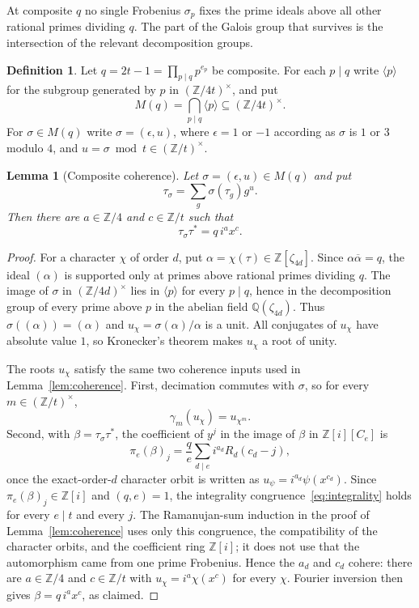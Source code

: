 \documentclass[11pt]{article}
\theoremstyle{plain}
\newtheorem{lemma}[theorem]{Lemma}
\theoremstyle{definition}
\newtheorem{definition}[theorem]{Definition}
\theoremstyle{remark}
\newcommand{\Z}{\mathbb Z}
\newcommand{\Q}{\mathbb Q}
\begin{document}
At composite $q$ no single Frobenius $\sigma_p$ fixes the prime ideals above all
other rational primes dividing $q$. The part of the Galois group that survives
is the intersection of the relevant decomposition groups.

\begin{definition}\label{def:composite-M}
Let $q=2t-1=\prod_{p\mid q}p^{e_p}$ be composite. For each $p\mid q$ write
$\langle p\rangle$ for the subgroup generated by $p$ in $(\Z/4t)^\times$, and
put
\[
  M(q)=\bigcap_{p\mid q}\langle p\rangle\subseteq(\Z/4t)^\times .
\]
For $\sigma\in M(q)$ write $\sigma=(\epsilon,u)$, where
$\epsilon=1$ or $-1$ according as $\sigma$ is $1$ or $3$ modulo $4$, and
$u=\sigma\bmod t\in(\Z/t)^\times$.
\end{definition}

\begin{lemma}[Composite coherence]\label{lem:composite-coherence}
Let $\sigma=(\epsilon,u)\in M(q)$ and put
\[
  \tau_\sigma=\sum_g\sigma(\tau_g)g^u .
\]
Then there are $a\in\Z/4$ and $c\in\Z/t$ such that
\[
  \tau_\sigma\tau^*=q\,i^a x^c .
\]
\end{lemma}

\begin{proof}
For a character $\chi$ of order $d$, put
$\alpha=\chi(\tau)\in\Z[\zeta_{4d}]$.  Since
$\alpha\overline\alpha=q$, the ideal $(\alpha)$ is supported only at primes
above rational primes dividing $q$.  The image of $\sigma$ in
$(\Z/4d)^\times$ lies in $\langle p\rangle$ for every $p\mid q$, hence in the
decomposition group of every prime above $p$ in the abelian field
$\Q(\zeta_{4d})$.  Thus $\sigma((\alpha))=(\alpha)$ and
$u_\chi=\sigma(\alpha)/\alpha$ is a unit.  All conjugates of $u_\chi$ have
absolute value $1$, so Kronecker's theorem makes $u_\chi$ a root of unity.

The roots $u_\chi$ satisfy the same two coherence inputs used in
Lemma~\ref{lem:coherence}.  First, decimation commutes with $\sigma$, so for
every $m\in(\Z/t)^\times$,
\[
  \gamma_m(u_\chi)=u_{\chi^m}.
\]
Second, with $\beta=\tau_\sigma\tau^*$, the coefficient of $y^j$ in the image
of $\beta$ in $\Z[i][C_e]$ is
\[
  \pi_e(\beta)_j=\frac qe\sum_{d\mid e} i^{a_d}R_d(c_d-j),
\]
once the exact-order-$d$ character orbit is written as
$u_\psi=i^{a_d}\psi(x^{c_d})$.  Since $\pi_e(\beta)_j\in\Z[i]$ and $(q,e)=1$,
the integrality congruence~\eqref{eq:integrality} holds for every $e\mid t$
and every $j$.  The Ramanujan-sum induction in the proof of
Lemma~\ref{lem:coherence} uses only this congruence, the compatibility of the
character orbits, and the coefficient ring $\Z[i]$; it does not use that the
automorphism came from one prime Frobenius.  Hence the $a_d$ and $c_d$ cohere:
there are $a\in\Z/4$ and $c\in\Z/t$ with
$u_\chi=i^a\chi(x^c)$ for every $\chi$.  Fourier inversion then gives
$\beta=q\,i^a x^c$, as claimed.
\end{proof}
\end{document}

